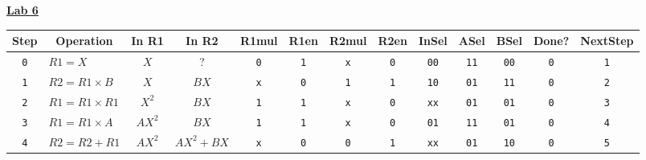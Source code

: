 \documentclass[12pt]{article}
\begin{document}
{\LARGE \noindent \underline{\textbf{Lab 6}}}

\begin{center}
	\begin{tabular}{|c|l|c|c||c|c|c|c|c|c|c|c|c|}
		\hline \cellcolor{gray!25}Step & \multicolumn{1}{c|}{\cellcolor{gray!25}Operation} & \cellcolor{gray!25}In R1 & \cellcolor{gray!25}In R2 & \cellcolor{gray!25}R1mul & \cellcolor{gray!25}R1en & \cellcolor{gray!25}R2mul & \cellcolor{gray!25}R2en & \cellcolor{gray!25}InSel & \cellcolor{gray!25}ASel & \cellcolor{gray!25}BSel & \cellcolor{gray!25}Done? & \cellcolor{gray!25}NextStep \\
		\hline\hline
		\texttt{0}                     & $R1=X       $                                     & $X$                      & ?                        & \texttt{0}               & \texttt{1}              & \texttt{x}               & \texttt{0}              & \texttt{00}              & \texttt{11}             & \texttt{00}             & \texttt{0}               & \texttt{1}                  \\\hline
		\texttt{1}                     & $R2 = R1  \times  B$                              & $X$                      & $BX$                     & \texttt{x}               & \texttt{0}              & \texttt{1}               & \texttt{1}              & \texttt{10}              & \texttt{01}             & \texttt{11}             & \texttt{0}               & \texttt{2}                  \\\hline
		\texttt{2}                     & $R1 = R1 \times R1 $                              & $X^2$                    & $BX$                     & \texttt{1}               & \texttt{1}              & \texttt{x}               & \texttt{0}              & \texttt{xx}              & \texttt{01}             & \texttt{01}             & \texttt{0}               & \texttt{3}                  \\\hline
		\texttt{3}                     & $R1 = R1 \times A  $                              & $AX^2$                   & $BX$                     & \texttt{1}               & \texttt{1}              & \texttt{x}               & \texttt{0}              & \texttt{01}              & \texttt{11}             & \texttt{01}             & \texttt{0}               & \texttt{4}                  \\\hline
		\texttt{4}                     & $R2 = R2+R1 $                                     & $AX^2$                   & $AX^2+BX$                & \texttt{x}               & \texttt{0}              & \texttt{0}               & \texttt{1}              & \texttt{xx}              & \texttt{01}             & \texttt{10}             & \texttt{0}               & \texttt{5}                  \\\hline

\end{tabular}
\end{center}
\end{document}
